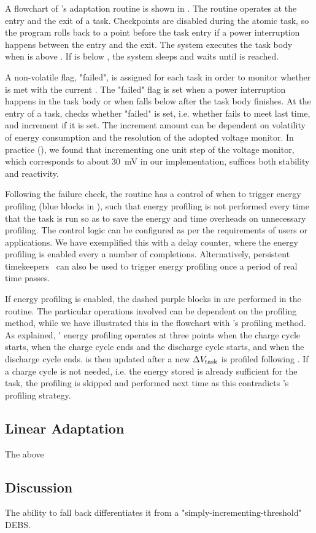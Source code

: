 A flowchart of \nn{}'s adaptation routine is shown in .
The routine operates at the entry and the exit of a task.
Checkpoints are disabled during the atomic task, so the program rolls back to a point before the task entry if a power interruption happens between the entry and the exit.
The system executes the task body when  is above . If  is below , the system sleeps and waits until  is reached.

A non-volatile flag, "failed", is assigned for each task in order to monitor whether  is met with the current .
The "failed" flag is set when a power interruption happens in the task body or when  falls below  after the task body finishes. 
At the entry of a task, \nn{} checks whether "failed" is set, i.e. whether  fails to meet  last time, and increment  if it is set. 
The increment amount can be dependent on volatility of energy consumption and the resolution of the adopted voltage monitor. 
In practice (), we found that incrementing one unit step of the voltage monitor, which corresponds to about \SI{30}{\milli\volt} in our implementation, suffices both stability and reactivity. 

Following the failure check, the routine has a control of when to trigger energy profiling (blue blocks in ), such that energy profiling is not performed every time that the task is run so as to save the energy and time overheads on unnecessary profiling. 
The control logic can be configured as per the requirements of users or applications. 
We have exemplified this with a delay counter, where the energy profiling is enabled every a number of completions. 
Alternatively, persistent timekeepers~\cite{winkel2020reliable, deep2020harc, hester2016persistent} can also be used to trigger energy profiling once a period of real time passes.

If energy profiling is enabled, the dashed purple blocks in  are performed in the routine. 
The particular operations involved can be dependent on the profiling method, while we have illustrated this in the flowchart with \nn{}'s profiling method. 
As explained, \nn{}' energy profiling operates at three points when the charge cycle starts, when the charge cycle ends and the discharge cycle starts, and when the discharge cycle ends. 
 is then updated after a new $\Delta V_{\text{task}}$ is profiled following . 
If a charge cycle is not needed, i.e. the energy stored is already sufficient for the task, the profiling is skipped and performed next time as this contradicts \nn{}'s profiling strategy.

\subsection{Linear Adaptation}

The above 

\subsection{Discussion}

The ability to fall back differentiates it from a "simply-incrementing-threshold" DEBS.
